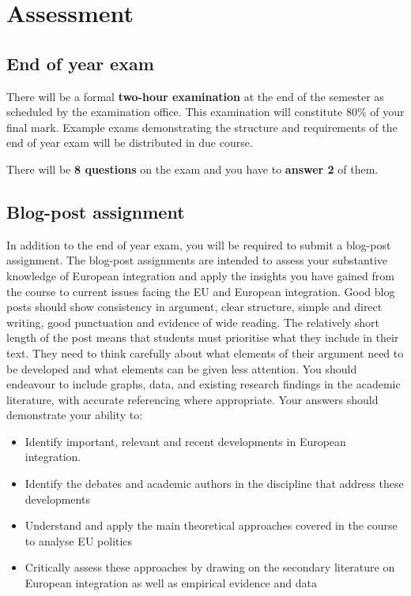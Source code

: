
\section*{Assessment}

\subsection*{End of year exam}

There will be a formal \textbf{two-hour examination} at the end of the semester as scheduled by the examination office. This examination will constitute 80\% of your final mark. Example exams demonstrating the structure and requirements of the end of year exam will be distributed in due course.

There will be \textbf{8 questions} on the exam and you have to \textbf{answer 2} of them.

\subsection*{Blog-post assignment}

In addition to the end of year exam, you will be required to submit a blog-post assignment. The blog-post assignments are intended to assess your substantive knowledge of European integration and apply the insights you have gained from the course to current issues facing the EU and European integration. Good blog posts should show consistency in argument, clear structure, simple and direct writing, good punctuation and evidence of wide reading. The relatively short length of the post means that students must prioritise what they include in their text. They need to think carefully about what elements of their argument need to be developed and what elements can be given less attention. You should endeavour to include graphs, data, and existing research findings in the academic literature, with accurate referencing where appropriate. Your answers should demonstrate your ability to:

\begin{itemize}
	\item Identify important, relevant and recent developments in European integration.
	\item Identify the debates and academic authors in the discipline that address these developments
	\item Understand and apply the main theoretical approaches covered in the course to analyse EU politics
	\item Critically assess these approaches by drawing on the secondary literature on European integration as well as empirical evidence and data
\end{itemize}

